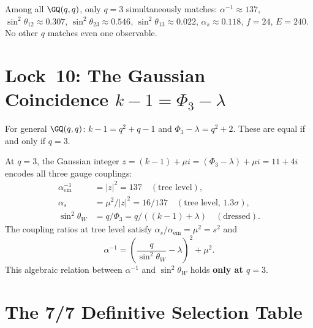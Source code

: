 \begin{theorem}
Among all $\GQ(q,q)$, only $q=3$ simultaneously matches:
$\alpha^{-1}\approx 137$,
$\sin^2\theta_{12}\approx 0.307$,
$\sin^2\theta_{23}\approx 0.546$,
$\sin^2\theta_{13}\approx 0.022$,
$\alpha_s\approx 0.118$,
$f = 24$,
$E = 240$.
No other $q$ matches even one observable.
\end{theorem}


\section{\texorpdfstring{Lock~10: The Gaussian Coincidence $k{-}1=\Phi_3{-}\lambda$}{Lock 10: The Gaussian Coincidence k-1 = Phi3-lambda}}

For general $\GQ(q,q)$: $k{-}1=q^2{+}q{-}1$ and $\Phi_3{-}\lambda=q^2{+}2$.
These are equal if and only if $q=3$.

\begin{theorem}
\label{thm:gaussian}
At $q=3$, the Gaussian integer $z = (k{-}1)+\mu i = (\Phi_3{-}\lambda)+\mu i
= 11+4i$ encodes all three gauge couplings:
\begin{align}
\alpha_{\mathrm{em}}^{-1} &= |z|^2 = 137 \quad (\text{tree level}), \\
\alpha_s &= \mu^2/|z|^2 = 16/137 \quad (\text{tree level, $1.3\sigma$}), \\
\sin^2\theta_W &= q/\Phi_3 = q/((k{-}1)+\lambda) \quad (\text{dressed}).
\end{align}
The coupling ratios at tree level satisfy $\alpha_s/\alpha_{\mathrm{em}} = \mu^2 = s^2$
and
\begin{equation}
\alpha^{-1} = \left(\frac{q}{\sin^2\theta_W} - \lambda\right)^2 + \mu^2.
\end{equation}
This algebraic relation between $\alpha^{-1}$ and $\sin^2\theta_W$
holds \textbf{only at $q=3$}.
\end{theorem}


\section{The 7/7 Definitive Selection Table}

